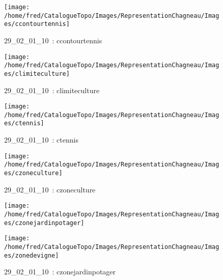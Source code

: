 \documentclass[12pt,titlepage]{book}
\begin{document}
\begin{figure}[h!]
\begin{minipage}[t]{3cm}
    \begin{center}
      \texttt{[image: /home/fred/CatalogueTopo/Images/RepresentationChagneau/Images/ccontourtennis]}
      \caption[~29\_02\_01\_10]{\small{29\_02\_01\_10~:} \tiny{ccontourtennis}}\label{ccontourtennis}
    \end{center}
  \end{minipage}
  \begin{minipage}[t]{3cm}
    \begin{center}
      \texttt{[image: /home/fred/CatalogueTopo/Images/RepresentationChagneau/Images/climiteculture]}
      \caption[~29\_02\_01\_10]{\small{29\_02\_01\_10~:} \tiny{climiteculture}}\label{climiteculture}
    \end{center}
  \end{minipage}
  \begin{minipage}[t]{3cm}
    \begin{center}
      \texttt{[image: /home/fred/CatalogueTopo/Images/RepresentationChagneau/Images/ctennis]}
      \caption[~29\_02\_01\_10]{\small{29\_02\_01\_10~:} \tiny{ctennis}}\label{ctennis}
    \end{center}
  \end{minipage}
  \begin{minipage}[t]{3cm}
    \begin{center}
      \texttt{[image: /home/fred/CatalogueTopo/Images/RepresentationChagneau/Images/czoneculture]}
      \caption[~29\_02\_01\_10]{\small{29\_02\_01\_10~:} \tiny{czoneculture}}\label{czoneculture}
    \end{center}
  \end{minipage}
  \begin{minipage}[t]{3cm}
    \begin{center}
      \texttt{[image: /home/fred/CatalogueTopo/Images/RepresentationChagneau/Images/czonejardinpotager]}
      \caption[~29\_02\_01\_10]{\small{29\_02\_01\_10~:} \tiny{czonejardinpotager}}\label{czonejardinpotager}
    \end{center}
  \end{minipage}
  \begin{minipage}[t]{3cm}
    \begin{center}
      \texttt{[image: /home/fred/CatalogueTopo/Images/RepresentationChagneau/Images/zonedevigne]}

\end{center}
\end{minipage}
\end{figure}
\end{document}
